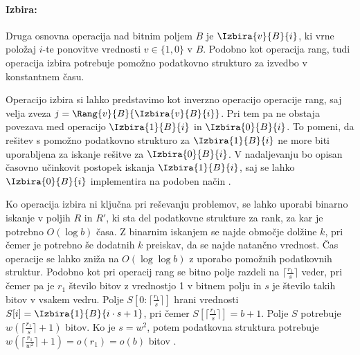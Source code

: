 \paragraph{Izbira:}
Druga osnovna operacija nad bitnim poljem $B$ je $\Izbira{v}{B}{i}$, ki vrne položaj $i$-te ponovitve vrednosti $v\in\{1,0\}$ v $B$. Podobno kot operacija rang, tudi operacija izbira potrebuje pomožno podatkovno strukturo za izvedbo v konstantnem času. 

Operacijo izbira si lahko predstavimo kot inverzno operacijo operacije rang, saj velja zveza $j=\Rang{v}{B}{\Izbira{v}{B}{i}}$. Pri tem pa ne obstaja povezava med operacijo $\Izbira{1}{B}{i}$ in $\Izbira{0}{B}{i}$. To pomeni, da rešitev s pomožno podatkovno strukturo za $\Izbira{1}{B}{i}$ ne more biti uporabljena za iskanje rešitve za $\Izbira{0}{B}{i}$. V nadaljevanju bo opisan časovno učinkovit postopek iskanja $\Izbira{1}{B}{i}$, saj se lahko $\Izbira{0}{B}{i}$ implementira na podoben način \cite{Navarro2016}.

Ko operacija izbira ni ključna pri reševanju problemov, se lahko uporabi binarno iskanje v poljih $R$ in $R'$, ki sta del podatkovne strukture za rank, za kar je potrebno $O(\log{b})$ časa. Z binarnim iskanjem se najde območje dolžine $k$, pri čemer je potrebno še dodatnih $k$ preiskav, da se najde natančno vrednost.
Čas operacije se lahko zniža na $O(\log\log b)$ z uporabo pomožnih podatkovnih struktur. Podobno kot pri operacij rang se bitno polje razdeli na $\lceil \frac{r_1}{s} \rceil$ veder, pri čemer pa je $r_1$ število bitov z vrednostjo 1 v bitnem polju in $s$ je število takih bitov v vsakem vedru. Polje $S[0:\lceil \frac{r_1}{s} \rceil]$ hrani vrednosti $S[i]=\Izbira{1}{B}{i\cdot s+1}$, pri čemer $S[\lceil \frac{r_1}{s} \rceil]=b+1$. Polje $S$ potrebuje $w(\lceil \frac{r_1}{s} \rceil +1)$ bitov. Ko je $s=w^2$, potem podatkovna struktura potrebuje $w(\lceil\frac{r_1}{w^2}\rceil+1)=o(r_1)=o(b)$ bitov \cite{Navarro2016}.

